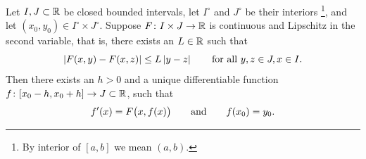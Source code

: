 \begin{thm}%
%
\label{thm:fs:picard}
Let $I, J \subset {\mathbb{R}}$ be closed bounded intervals, 
let $I^\circ$ and $J^\circ$ be their interiors%
\footnote{By interior of $[a,b]$ we mean $(a,b)$.},
and
let $(x_0,y_0) \in I^\circ \times J^\circ$.
Suppose $F \colon I \times J \to {\mathbb{R}}$ is continuous
and Lipschitz in the second variable, that is, there exists
an $L \in {\mathbb{R}}$ such that
\begin{equation*}
\left\lvert {F(x,y) - F(x,z)} \right\rvert \leq L \left\lvert {y-z} \right\rvert
\qquad \text{for all } y,z \in J, x \in I .
\end{equation*}
Then there exists an $h > 0$ and a unique differentiable
function $f \colon [x_0 - h, x_0 + h] \to J \subset {\mathbb{R}}$, such that
\begin{equation} \label{picard:diffeq}
f'(x) = F\bigl(x,f(x)\bigr) \qquad \text{and} \qquad f(x_0) = y_0.
\pagebreak[2]
\end{equation}
\end{thm}

